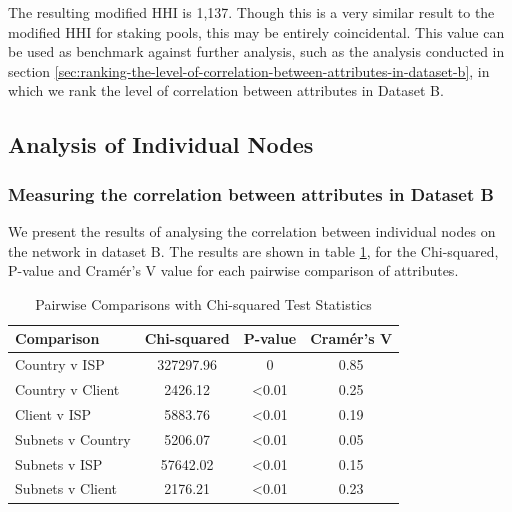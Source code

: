 \documentclass[conference]{IEEEtran}
\begin{document}
The resulting modified HHI is 1,137. Though this is a very similar result to the modified HHI for staking pools, this may be entirely coincidental.  This value can be used as benchmark against further analysis, such as the analysis conducted in section \ref{sec:ranking-the-level-of-correlation-between-attributes-in-dataset-b}, in which we rank the level of correlation between attributes in Dataset B.

\subsection{Analysis of Individual Nodes}

\subsubsection{Measuring the correlation between attributes in Dataset B}

We present the results of analysing the correlation between individual nodes on the network in dataset B. The results are shown in table \ref{tab:pairwise-comparisons-dataset-b}, for the Chi-squared, P-value and Cramér's V value for each pairwise comparison of attributes.

\begin{table}[ht]
    \centering
    \renewcommand{\arraystretch}{1.5}
    \begin{tabular}{|p{2.5cm}|c|c|c|}
        \hline
        \textbf{Comparison} & \textbf{Chi-squared} & \textbf{P-value} & \textbf{Cramér's V} \\
        \hline
        Country v ISP & 327297.96 & 0 & 0.85 \\ \hline
        Country v Client & 2426.12 & \textless 0.01 & 0.25 \\ \hline
        Client v ISP & 5883.76 & \textless 0.01 & 0.19 \\ \hline
        Subnets v Country & 5206.07 & \textless 0.01 & 0.05 \\ \hline
        Subnets v ISP & 57642.02 & \textless 0.01 & 0.15 \\ \hline
        Subnets v Client & 2176.21 & \textless 0.01 & 0.23 \\ \hline
    \end{tabular}
    \vspace{10pt}
    \caption{Pairwise Comparisons with Chi-squared Test Statistics}
    \label{tab:pairwise-comparisons-dataset-b}
\end{table}
\end{document}
